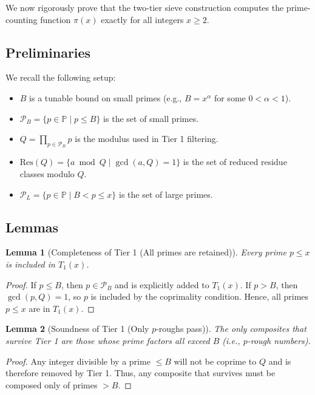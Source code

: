 \documentclass[11pt]{article}
\newtheorem{lemma}{Lemma}
\begin{document}
	We now rigorously prove that the two-tier sieve construction computes the prime-counting function $\pi(x)$ exactly for all integers $x \geq 2$.
	
	\subsection{Preliminaries}
	
	We recall the following setup:
	\begin{itemize}
		\item $B$ is a tunable bound on small primes (e.g., $B = x^\alpha$ for some $0 < \alpha < 1$).
		\item $\mathcal{P}_B = \{p \in \mathbb{P} \mid p \leq B\}$ is the set of small primes.
		\item $Q = \prod_{p \in \mathcal{P}_B} p$ is the modulus used in Tier 1 filtering.
		\item $\text{Res}(Q) = \{a \bmod Q \mid \gcd(a, Q) = 1\}$ is the set of reduced residue classes modulo $Q$.
		\item $\mathcal{P}_L = \{p \in \mathbb{P} \mid B < p \leq x\}$ is the set of large primes.
	\end{itemize}
	
	
	\subsection{Lemmas}
	
	\begin{lemma}[Completeness of Tier 1 (All primes are retained)]
		Every prime $p \leq x$ is included in $T_1(x)$.
	\end{lemma}
	
	\begin{proof}
		If $p \leq B$, then $p \in \mathcal{P}_B$ and is explicitly added to $T_1(x)$.  
		If $p > B$, then $\gcd(p, Q) = 1$, so $p$ is included by the coprimality condition.  
		Hence, all primes $p \leq x$ are in $T_1(x)$.
	\end{proof}
	
	\begin{lemma}[Soundness of Tier 1 (Only $p$-roughs pass)]
		The only composites that survive Tier 1 are those whose prime factors all exceed $B$ (i.e., $p$-rough numbers).
	\end{lemma}
	
	\begin{proof}
		Any integer divisible by a prime $\leq B$ will not be coprime to $Q$ and is therefore removed by Tier 1.  
		Thus, any composite that survives must be composed only of primes $> B$.
	\end{proof}
	
\end{document}

